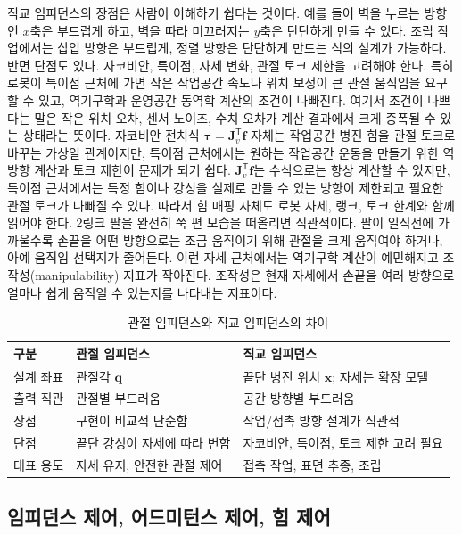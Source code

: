 

직교 임피던스의 장점은 사람이 이해하기 쉽다는 것이다.
예를 들어 벽을 누르는 방향인 $x$축은 부드럽게 하고, 벽을 따라 미끄러지는 $y$축은 단단하게 만들 수 있다.
조립 작업에서는 삽입 방향은 부드럽게, 정렬 방향은 단단하게 만드는 식의 설계가 가능하다.
반면 단점도 있다.
자코비안, 특이점, 자세 변화, 관절 토크 제한을 고려해야 한다.
특히 로봇이 특이점 근처에 가면 작은 작업공간 속도나 위치 보정이 큰 관절 움직임을 요구할 수 있고, 역기구학과 운영공간 동역학 계산의 조건이 나빠진다.
여기서 조건이 나쁘다는 말은 작은 위치 오차, 센서 노이즈, 수치 오차가 계산 결과에서 크게 증폭될 수 있는 상태라는 뜻이다.
자코비안 전치식 $\bm{\tau}=\bm{J}_v^{\mathsf{T}}\bm{f}$ 자체는 작업공간 병진 힘을 관절 토크로 바꾸는 가상일 관계이지만, 특이점 근처에서는 원하는 작업공간 운동을 만들기 위한 역방향 계산과 토크 제한이 문제가 되기 쉽다.
$\bm{J}_v^{\mathsf{T}}\bm{f}$는 수식으로는 항상 계산할 수 있지만, 특이점 근처에서는 특정 힘이나 강성을 실제로 만들 수 있는 방향이 제한되고 필요한 관절 토크가 나빠질 수 있다.
따라서 힘 매핑 자체도 로봇 자세, 랭크, 토크 한계와 함께 읽어야 한다.
2링크 팔을 완전히 쭉 편 모습을 떠올리면 직관적이다.
팔이 일직선에 가까울수록 손끝을 어떤 방향으로는 조금 움직이기 위해 관절을 크게 움직여야 하거나, 아예 움직임 선택지가 줄어든다.
이런 자세 근처에서는 역기구학 계산이 예민해지고 조작성(manipulability) 지표가 작아진다.
조작성은 현재 자세에서 손끝을 여러 방향으로 얼마나 쉽게 움직일 수 있는지를 나타내는 지표이다.

\begin{table}[!htbp]
  \centering
  \caption{관절 임피던스와 직교 임피던스의 차이}
  \begin{tabular}{lll}
    \toprule
    구분 & 관절 임피던스 & 직교 임피던스 \\
    \midrule
    설계 좌표 & 관절각 $\bm{q}$ & 끝단 병진 위치 $\bm{x}$; 자세는 확장 모델 \\
    출력 직관 & 관절별 부드러움 & 공간 방향별 부드러움 \\
    장점 & 구현이 비교적 단순함 & 작업/접촉 방향 설계가 직관적 \\
    단점 & 끝단 강성이 자세에 따라 변함 & 자코비안, 특이점, 토크 제한 고려 필요 \\
    대표 용도 & 자세 유지, 안전한 관절 제어 & 접촉 작업, 표면 추종, 조립 \\
    \bottomrule
  \end{tabular}
\end{table}

\subsection{임피던스 제어, 어드미턴스 제어, 힘 제어}

